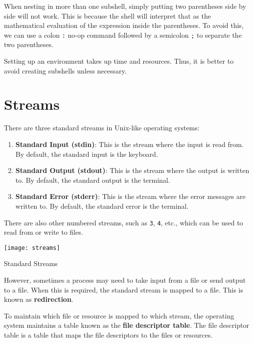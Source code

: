 \begin{remark}
  When nesting in more than one subshell, simply putting two parentheses
  side by side will not work. This is because the shell will interpret
  that as the mathematical evaluation of the expression inside the
  parentheses. To avoid this, we can use a colon \lstinline|:| no-op command
  followed by a semicolon \lstinline|;| to separate the two parentheses.
\end{remark}

\begin{remark}
  Setting up an environment takes up time and resources. Thus, it is
  better to avoid creating subshells unless necessary.
\end{remark}

\vfill
\pagebreak
\section{Streams}

There are three standard streams in Unix-like operating systems:

\begin{enumerate}
  \item \textbf{Standard Input (stdin)}: This is the stream where the
    input is read from. By default, the standard input is the keyboard.
  \item \textbf{Standard Output (stdout)}: This is the stream where the
    output is written to. By default, the standard output is the terminal.
  \item \textbf{Standard Error (stderr)}: This is the stream where the
    error messages are written to. By default, the standard error is the
    terminal.
\end{enumerate}

There are also other numbered streams, such as \lstinline|3|, \lstinline|4|,
etc., which can be used to read from or write to files.

\begin{marginfigure}
  \texttt{[image: streams]}
  \caption{Standard Streams}
\end{marginfigure}

However, sometimes a process may need to take input from a file or
send output to a file. When this is required, the standard stream is
mapped to a file. This is known as \textbf{redirection}.

To maintain which file or resource is mapped to which stream, the
operating system maintains a table known as the \textbf{file descriptor
table}. The file descriptor table is a table that maps the file
descriptors to the files or resources.

